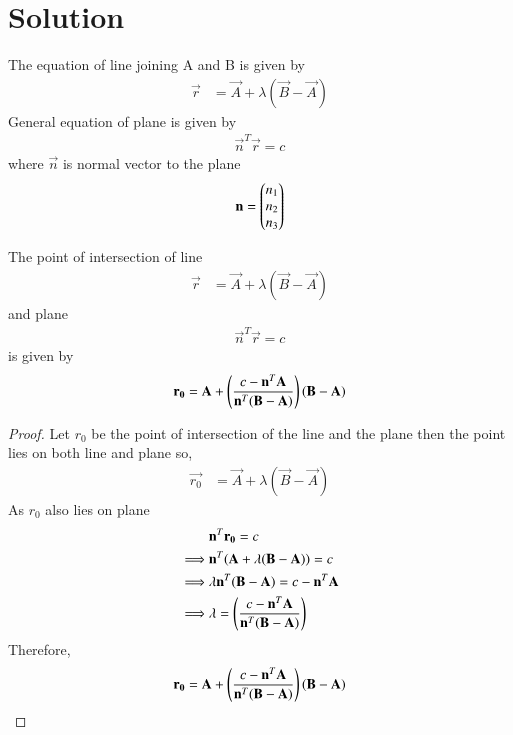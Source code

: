 \documentclass[journal,12pt,twocolumn]{IEEEtran}
\begin{document}
\section{Solution}
The equation of line joining A and B is given by 
\begin{align}
    \vec{r} &= \vec{A}+\lambda(\vec{B}-\vec{A})   
\end{align}
General equation of plane is given by
\begin{align}
    \vec{n}^T\vec{r} = c
\end{align}
where $\vec{n}$ is normal vector to the plane 
\begin{align}
    \mathbf{n} = \begin{pmatrix}n_1\\n_2\\n_3\end{pmatrix}
\end{align}
\begin{lemma}
    The point of intersection of line
    \begin{align}
        \vec{r} &= \vec{A}+\lambda(\vec{B}-\vec{A})
    \end{align}
    and plane
    \begin{align}
        \vec{n}^T\vec{r} = c  
    \end{align}
    is given by
    \begin{align}
        \mathbf{r_0} = \mathbf{A}+\left(\frac{c-\mathbf{n}^T\mathbf{A}}{\mathbf{n}^T(\mathbf{B}-\mathbf{A})}\right)(\mathbf{B}-\mathbf{A})
    \end{align}
\end{lemma}
\begin{proof}
Let $r_0$ be the point of intersection of the line and the plane then the point lies on both line and plane so,
\begin{align}
    \vec{r_0} &= \vec{A}+\lambda(\vec{B}-\vec{A})  
\end{align}
As $r_0$ also lies on plane
\begin{align}
    &\mathbf{n}^T\mathbf{r_0} = c\\
    \implies &\mathbf{n}^T(\mathbf{A}+\lambda(\mathbf{B}-\mathbf{A})) = c\\
    \implies &\lambda\mathbf{n}^T(\mathbf{B}-\mathbf{A}) = c-\mathbf{n}^T\mathbf{A}\\
    \implies &\lambda = \left(\frac{c-\mathbf{n}^T\mathbf{A}}{\mathbf{n}^T(\mathbf{B}-\mathbf{A})}\right)
\end{align}
Therefore,
\begin{align}
    \mathbf{r_0} = \mathbf{A}+\left(\frac{c-\mathbf{n}^T\mathbf{A}}{\mathbf{n}^T(\mathbf{B}-\mathbf{A})}\right)(\mathbf{B}-\mathbf{A})
\end{align}
\end{proof}
\end{document}
